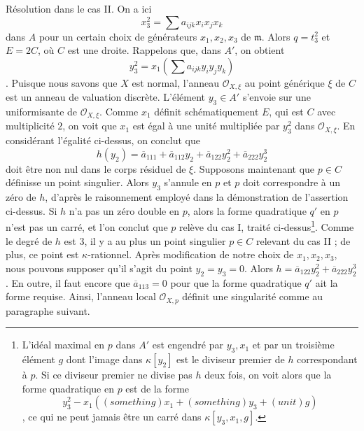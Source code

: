 \medskip\noindent Résolution dans le cas II. On a ici $$
x_3^2 = \sum a_{ijk}x_ix_jx_k
$$ dans $A$ pour un certain choix de générateurs $x_1, x_2, x_3$ de $\mathfrak m$. Alors $q = t_3^2$ et $E = 2C$, où $C$ est une droite. Rappelons que, dans $A'$, on obtient $$
y_3^2 = x_1(\sum a_{ijk} y_iy_jy_k)
$$. Puisque nous savons que $X$ est normal, l'anneau $\mathcal{O}_{X, \xi}$ au point générique $\xi$ de $C$ est un anneau de valuation discrète. L'élément $y_3 \in A'$ s'envoie sur une uniformisante de $\mathcal{O}_{X, \xi}$. Comme $x_1$ définit schématiquement $E$, qui est $C$ avec multiplicité $2$, on voit que $x_1$ est égal à une unité multipliée par $y_3^2$ dans $\mathcal{O}_{X, \xi}$. En considérant l'égalité ci-dessus, on conclut que $$
h(y_2) = \overline{a}_{111} + \overline{a}_{112} y_2 +
\overline{a}_{122} y_2^2 +
\overline{a}_{222} y_2^3
$$ doit être non nul dans le corps résiduel de $\xi$. Supposons maintenant que $p \in C$ définisse un point singulier. Alors $y_3$ s'annule en $p$ et $p$ doit correspondre à un zéro de $h$, d'après le raisonnement employé dans la démonstration de l'assertion ci-dessus. Si $h$ n'a pas un zéro double en $p$, alors la forme quadratique $q'$ en $p$ n'est pas un carré, et l'on conclut que $p$ relève du cas I, traité ci-dessus\footnote{L'idéal maximal en $p$ dans $A'$ est engendré par $y_3, x_1$ et par un troisième élément $g$ dont l'image dans $\kappa[y_2]$ est le diviseur premier de $h$ correspondant à $p$. Si ce diviseur premier ne divise pas $h$ deux fois, on voit alors que la forme quadratique en $p$ est de la forme $$
y_3^2 - x_1((something)x_1 + (something)y_3 + (unit)g)
$$, ce qui ne peut jamais être un carré dans $\kappa[y_3, x_1, g]$.}. Comme le degré de $h$ est $3$, il y a au plus un point singulier $p \in C$ relevant du cas II ; de plus, ce point est $\kappa$-rationnel. Après modification de notre choix de $x_1, x_2, x_3$, nous pouvons supposer qu'il s'agit du point $y_2 = y_3 = 0$. Alors $h = \overline{a}_{122} y_2^2 + \overline{a}_{222} y_2^3$. En outre, il faut encore que $\overline{a}_{113} = 0$ pour que la forme quadratique $q'$ ait la forme requise. Ainsi, l'anneau local $\mathcal{O}_{X, p}$ définit une singularité comme au paragraphe suivant.

